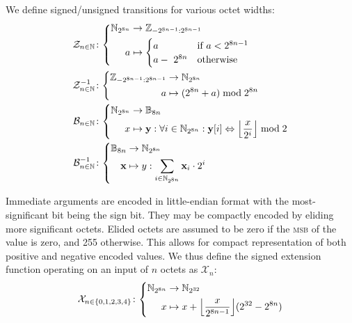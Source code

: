 We define signed/unsigned transitions for various octet widths:
\begin{align}
  \label{eq:signedfunc}
  \signfunc{n \in \N}&\colon\left\{\begin{aligned}
    \N_{2^{8n}} &\to \Z_{-2^{8n-1}:2^{8n-1}}\\
    a &\mapsto \begin{cases}
      a &\when a < 2^{8n-1} \\
      a -\ 2^{8n} &\otherwise
    \end{cases}
  \end{aligned}\right.\\
  \unsignfunc{n \in \N}&\colon\left\{\begin{aligned}
    \Z_{-2^{8n-1}:2^{8n-1}} &\to \N_{2^{8n}}\\
    a &\mapsto (2^{8n} + a) \bmod 2^{8n}
  \end{aligned}\right.\\
  \label{eq:bitsfunc}
  \bitsfunc{n\in\N}&\colon\left\{\begin{aligned}
    \N_{2^{8n}} &\to \mathbb{B}_{8n}\\
    x &\mapsto \mathbf{y}: \forall i \in \N_{2^{8n}} : \mathbf{y}[i] \Leftrightarrow \ffrac{x}{2^i}\bmod 2
  \end{aligned}\right.\\
  \unbitsfunc{n\in\N}&\colon\left\{\begin{aligned}
    \mathbb{B}_{8n} &\to \N_{2^{8n}}\\
    \mathbf{x} &\mapsto y: \sum_{i \in \N_{2^{8n}}} \mathbf{x}_i \cdot 2^i
  \end{aligned}\right.
\end{align}

\newcommand{\sext}{\mathcal{X}}

Immediate arguments are encoded in little-endian format with the most-significant bit being the sign bit. They may be compactly encoded by eliding more significant octets. Elided octets are assumed to be zero if the \textsc{msb} of the value is zero, and 255 otherwise. This allows for compact representation of both positive and negative encoded values. We thus define the signed extension function operating on an input of $n$ octets as $\sext_n$:
\begin{align}\label{eq:signedextension}
  \sext_{n\in\{0, 1, 2, 3, 4\}}\colon\left\{\begin{aligned}
    \N_{2^{8n}} &\to \N_{2^{32}}\\
    x &\mapsto x + \ffrac{x}{2^{8n-1}}(2^{32}-2^{8n})
  \end{aligned}\right.
\end{align}

